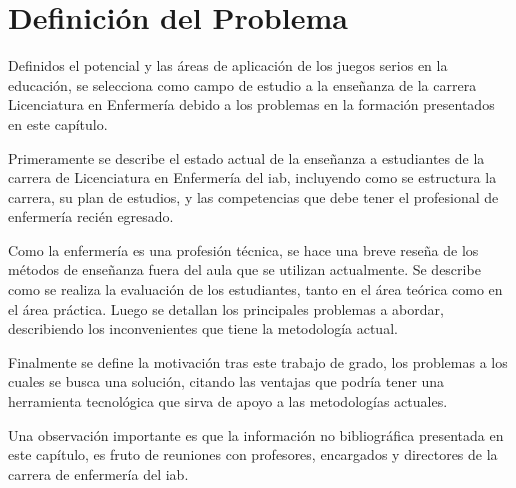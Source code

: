 \chapter{Definición del Problema}
\label{chap:problema}


Definidos el potencial y las áreas de aplicación de los juegos serios en la educación,
se selecciona como campo de estudio a la enseñanza de 
la carrera Licenciatura en Enfermería debido a los problemas en la formación presentados
en este capítulo.

Primeramente se describe el estado actual de la enseñanza a estudiantes de la carrera 
de Licenciatura en Enfermería del \Gls{iab}, incluyendo como se estructura la carrera, 
su plan de estudios, y las competencias que debe tener el profesional de enfermería recién 
egresado.

Como la enfermería es una profesión técnica, se hace una breve reseña de los
métodos de enseñanza fuera del aula que se utilizan actualmente.
Se describe como se realiza la evaluación de los estudiantes, tanto en el área
teórica como en el área práctica. Luego se detallan los principales problemas a abordar, 
describiendo los inconvenientes que tiene la metodología actual.

Finalmente se define la motivación tras este trabajo de grado, los problemas a los
cuales se busca una solución, citando las ventajas que podría tener una herramienta
tecnológica que sirva de apoyo a las metodologías actuales.

Una observación importante es que la información no bibliográfica presentada 
en este capítulo, es fruto de reuniones con profesores, encargados y directores 
de la carrera de enfermería del \Gls{iab}.




